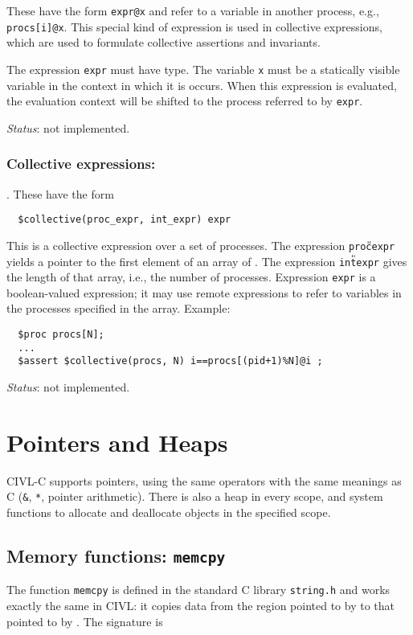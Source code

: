 These have the form \verb!expr@x! and refer to a variable in another
process, e.g., \verb!procs[i]@x!. This special kind of expression is
used in collective expressions, which are used to formulate collective
assertions and invariants.

The expression \verb!expr! must have \cproc{} type.  The variable
\texttt{x} must be a statically visible variable in the context in
which it is occurs.  When this expression is evaluated, the evaluation
context will be shifted to the process referred to by \texttt{expr}.

\emph{Status}: not implemented.

\subsection{Collective expressions: \ccollective}.  These have the form
\begin{verbatim}
  $collective(proc_expr, int_expr) expr 
\end{verbatim}
This is a collective expression over a set of processes.  The
expression \texttt{proc{\U}expr} yields a pointer to the first element
of an array of \cproc.  The expression \texttt{int{\U}expr} gives the
length of that array, i.e., the number of processes.  Expression
\texttt{expr} is a boolean-valued expression; it may use remote
expressions to refer to variables in the processes specified in the
array.  Example:
\begin{verbatim}
  $proc procs[N];
  ...
  $assert $collective(procs, N) i==procs[(pid+1)%N]@i ;
\end{verbatim}

\emph{Status}: not implemented.

\chapter{Pointers and Heaps}
\label{chap:pointers}

CIVL-C supports pointers, using the same operators with the same
meanings as C (\texttt{\&}, \texttt{*}, pointer arithmetic).  There is
also a heap in every scope, and system functions to allocate and
deallocate objects in the specified scope.

\section{Memory functions: \texttt{memcpy}}

The function \texttt{memcpy} is defined in the standard C library
\texttt{string.h} and works exactly the same in CIVL: it copies
data from the region pointed to by  to that pointed to by
.  The signature is

